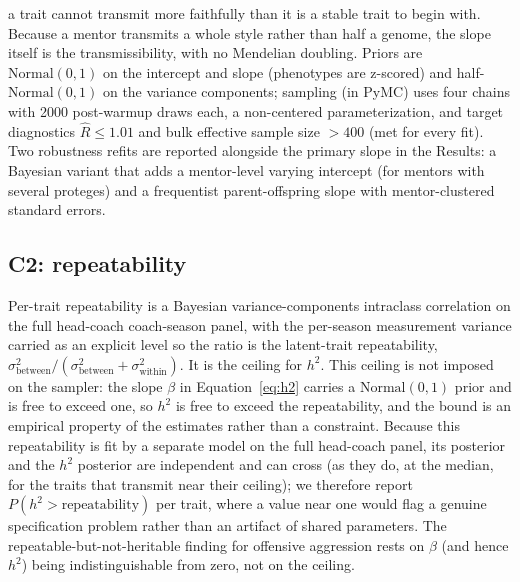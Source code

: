 \documentclass[
  journal=ehs,
  manuscript=article,
  year=2026,
  volume=8,
]{cup-journal}
\begin{document}
a trait cannot transmit more faithfully than it is a stable trait to begin with.
Because a mentor transmits a whole style rather than half a genome, the slope
itself is the transmissibility, with no Mendelian doubling. Priors are
$\mathrm{Normal}(0,1)$ on the intercept and slope (phenotypes are z-scored) and
half-$\mathrm{Normal}(0,1)$ on the variance components; sampling (in PyMC) uses four
chains with 2000 post-warmup draws each, a non-centered parameterization, and target
diagnostics $\hat{R}\le 1.01$ and bulk effective sample size $>400$ (met for every
fit). Two robustness refits are reported alongside the primary slope in the Results:
a Bayesian variant that adds a mentor-level varying intercept (for mentors with
several proteges) and a frequentist parent-offspring slope with mentor-clustered
standard errors.

\subsection{C2: repeatability}
Per-trait repeatability is a Bayesian variance-components intraclass correlation on
the full head-coach coach-season panel, with the per-season measurement variance
carried as an explicit level so the ratio is the latent-trait repeatability,
$\sigma_{\text{between}}^2/(\sigma_{\text{between}}^2+\sigma_{\text{within}}^2)$. It
is the ceiling for $h^{2}$. This ceiling is not imposed on the sampler: the slope
$\beta$ in Equation~\ref{eq:h2} carries a $\mathrm{Normal}(0,1)$ prior and is free
to exceed one, so $h^{2}$ is free to exceed the repeatability, and the bound is an
empirical property of the estimates rather than a constraint. Because this
repeatability is fit by a separate model on the full head-coach panel, its posterior
and the $h^{2}$ posterior are independent and can cross (as they do, at the median,
for the traits that transmit near their ceiling); we therefore report
$P(h^{2}>\text{repeatability})$ per trait, where a value near one would flag a
genuine specification problem rather than an artifact of shared parameters. The
repeatable-but-not-heritable finding for offensive aggression rests on $\beta$ (and
hence $h^{2}$) being indistinguishable from zero, not on the ceiling.
\end{document}
